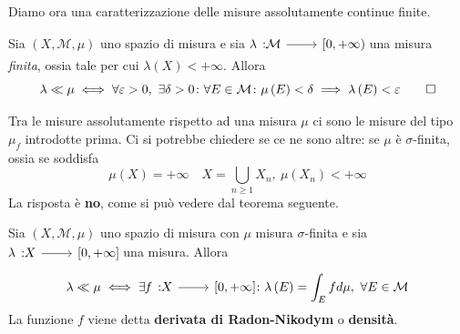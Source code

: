 Diamo ora una caratterizzazione delle misure assolutamente continue finite.
\begin{theoremaqed}
Sia $\left(X,\mathcal{M},\mu\right)$ uno spazio di misura e sia $\funz{\lambda}{\mathcal{M}}{\left[0,+\infty\right)}$ una misura \textit{finita}, ossia tale per cui $\lambda(X)<+\infty$.
Allora
\begin{equation}
	\lambda\ll\mu\iff\forall \epsilon>0,\ \exists\delta>0\colon\forall E\in\mathcal{M}\colon \mu\left(E\right)<\delta\implies \lambda\left(E\right)<\epsilon\qedhere
\end{equation}
\end{theoremaqed}
Tra le misure assolutamente rispetto ad una misura $\mu$ ci sono le misure del tipo $\mu_f$ introdotte prima. Ci si potrebbe chiedere se ce ne sono altre: se $\mu$ è $\sigma$-finita, ossia se soddisfa
\begin{equation*}
	\mu(X)=+\infty\quad X=\bigcup_{n\geq 1}X_n,\ \mu\left(X_n\right)<+\infty
\end{equation*}
La risposta è \textbf{no}, come si può vedere dal teorema seguente.
\begin{theoremaqed}
	Sia $\left(X,\mathcal{M},\mu\right)$ uno spazio di misura con $\mu$ misura $\sigma$-finita e sia $\funz{\lambda}{X}{\left[0,+\infty\right]}$ una misura. Allora
	\begin{equation}
		\lambda\ll\mu\iff \exists \funz{f}{X}{\left[0,+\infty\right]}\colon\lambda\left(E\right)=\int_Efd\mu,\ \forall E\in\mathcal{M}
	\end{equation}
La funzione $f$ viene detta \textbf{derivata di Radon-Nikodym} o \textbf{densità}.
\end{theoremaqed}
